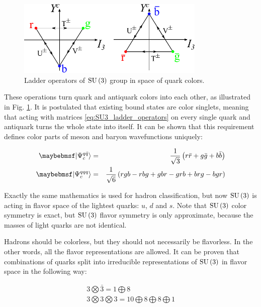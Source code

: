 \begin{figure}
  \centering
  \includegraphics[width = 0.8\textwidth]{illustrations/intro_illustrations/SU3_ladder_operators.pdf}
  \caption{Ladder operators of $\mathrm{SU}\left({3}\right)$ group in space of quark
           colors.}
  \label{fig:q_color_ladder_operators}
\end{figure}

These operations turn quark and antiquark colors into each other, as
illustrated in Fig.  \ref{fig:q_color_ladder_operators}. It is postulated
that existing bound states are color singlets, meaning that acting with
matrices \ref{eq:SU3_ladder_operators} on every single quark and antiquark
turns the whole state into itself. It can be shown that this requirement
defines color parts of meson and baryon wavefunctions uniquely:

\begin{align}
  \ket{\Psi_c^{q\bar{q}}} &=& \frac{1}{\sqrt{3}} \parenths{r\bar{r} + g\bar{g} + b\bar{b}} \\
  \ket{\Psi_c^{qqq}} &=& \frac{1}{\sqrt{6}} \parenths{rgb - rbg + gbr - grb + brg - bgr}
\end{align}

Exactly the same mathematics is used for hadron classification, but now
$\mathrm{SU}\left({3}\right)$ is acting in flavor space of the lightest quarks: $u$, $d$ and
$s$. Note that $\mathrm{SU}\left({3}\right)$ color symmetry is exact, but $\mathrm{SU}\left({3}\right)$ flavor
symmetry is only approximate, because the masses of light quarks are not
identical.

Hadrons should be colorless, but they should not necessarily be flavorless. In
the other words, all the flavor representations are allowed. It can be proven
that combinations of quarks split into irreducible representations of $\mathrm{SU}\left({3}\right)$
in flavor space in the following way:

\begin{align}
  3 \bigotimes \bar{3} = 1 \bigoplus 8 \\
  3 \bigotimes 3 \bigotimes 3 = 10 \bigoplus 8 \bigoplus 8 \bigoplus 1
\end{align}

